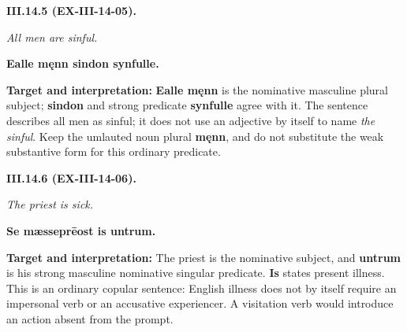 \par\begin{minipage}{\linewidth}\raggedright
\textbf{III.14.5 (EX-III-14-05).}

\emph{All men are sinful.}

\textbf{Ealle męnn sindon synfulle.}

\textbf{Target and interpretation:} \textbf{Ealle męnn} is the nominative masculine plural subject; \textbf{sindon} and strong predicate \textbf{synfulle} agree with it. The sentence describes all men as sinful; it does not use an adjective by itself to name \emph{the sinful}. Keep the umlauted noun plural \textbf{męnn}, and do not substitute the weak substantive form for this ordinary predicate.

\end{minipage}\par\addvspace{4pt}

\par\begin{minipage}{\linewidth}\raggedright
\textbf{III.14.6 (EX-III-14-06).}

\emph{The priest is sick.}

\textbf{Se mæsseprēost is untrum.}

\textbf{Target and interpretation:} The priest is the nominative subject, and \textbf{untrum} is his strong masculine nominative singular predicate. \textbf{Is} states present illness. This is an ordinary copular sentence: English illness does not by itself require an impersonal verb or an accusative experiencer. A visitation verb would introduce an action absent from the prompt.

\end{minipage}\par\addvspace{4pt}

